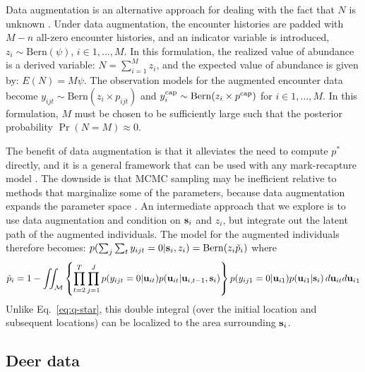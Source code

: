 \documentclass[12pt]{article}
\newcommand{\bsi}{{\bf s}_i}
\newcommand{\bu}{{\bf u}}
\newcommand{\bui}{{\bf u}_i}
\newcommand{\buit}{{\bf u}_{it}}
\begin{document}
Data augmentation is an alternative approach for dealing with the fact
that $N$ is unknown \citep{royle_etal:2007}. Under data augmentation,
the encounter histories  are padded with $M-n$ all-zero encounter
histories, and an indicator variable is introduced,
$z_i \sim \mathrm{Bern}(\psi)$, $i \in 1, \dots, M$. In this
formulation, the realized value of abundance is a derived variable:
$N = \sum_{i=1}^M z_i$, and the
expected value of abundance is given by: $E(N) = M\psi$.  
The observation models for the augmented encounter data become
$y_{ijt} \sim \mathrm{Bern}(z_i \times p_{ijt})$ and
$y^{\rm cap}_{i} \sim \mathrm{Bern}(z_i \times p^{\rm cap})$ for
$i \in 1, \dots, M$. In this formulation, $M$ must be chosen to be
sufficiently large such that the posterior probability
$\Pr(N=M) \approx 0$. 

The benefit of data augmentation is that it alleviates
the need to compute $p^*$ directly,
and it is a general framework that can be used with any mark-recapture
model \citep{royle_dorazio:2008}. The downside is that MCMC sampling
may be inefficient relative to methods that marginalize some of the
parameters, because data augmentation expands the parameter
space \citep{king_etal:2016}. An intermediate approach that we explore
is to use data augmentation and condition on ${\bsi}$ and $z_i$, but
integrate out the latent path of the augmented individuals. The model
for the augmented individuals therefore becomes:
$p(\sum_j \sum_t y_{ijt}=0|\bsi,z_i) = \mathrm{Bern}(z_i \tilde{p}_i)$ where
\begin{equation}
  \tilde{p}_i = 1-\iint_{\mathcal{M}} \left\{\prod_{t=2}^T \prod_{j=1}^J p(y_{ijt}=0|\buit)p(\buit|\bu_{i,t-1},\bsi)\right\}p(y_{ij1}=0|\bu_{i1})p(\bu_{i1}|\bsi) \, d\buit d{\bui}_1
\label{eq:p-tilde}
\end{equation}
Unlike Eq.~\ref{eq:q-star}, this double integral (over the initial
location and subsequent locations) can be localized to the area
surrounding $\bsi$. %




\subsection{Deer data}
\end{document}
